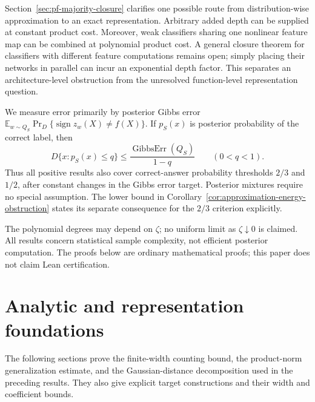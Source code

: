 \documentclass[11pt]{article}
\begin{document}
Section~\ref{sec:pf-majority-closure} clarifies one possible route
from distribution-wise approximation to an exact representation.
Arbitrary added depth can be supplied at constant product cost.
Moreover, weak classifiers sharing one nonlinear feature map can be
combined at polynomial product cost. A general closure theorem for
classifiers with different feature computations remains open; simply
placing their networks in parallel can incur an exponential depth
factor. This separates an architecture-level obstruction from the
unresolved function-level representation question.

We measure error primarily by posterior Gibbs error
$\mathbb E_{w\sim Q_S}\Pr_D\{\operatorname{sign}z_w(X)\ne f(X)\}$.
If $p_S(x)$ is posterior probability of the correct label, then
\[
 D\{x:p_S(x)\le q\}\le
 \frac{\operatorname{GibbsErr}(Q_S)}{1-q}\qquad(0<q<1).
\]
Thus all positive results also cover correct-answer probability
thresholds $2/3$ and $1/2$, after constant changes in the Gibbs error
target. Posterior mixtures require no special assumption. The lower
bound in Corollary~\ref{cor:approximation-energy-obstruction} states
its separate consequence for the $2/3$ criterion explicitly.

The polynomial degrees may depend on $\zeta$; no uniform limit as
$\zeta\downarrow0$ is claimed. All results concern statistical sample
complexity, not efficient posterior computation. The proofs below are
ordinary mathematical proofs; this paper does not claim Lean certification.


















\section*{Analytic and representation foundations}
The following sections prove the finite-width counting bound, the
product-norm generalization estimate, and the Gaussian-distance
decomposition used in the preceding results. They also give explicit
target constructions and their width and coefficient bounds.
\end{document}
